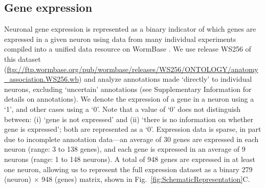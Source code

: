 \documentclass[10pt,letterpaper]{article}
\begin{document}
\subsection*{Gene expression}
Neuronal gene expression is represented as a binary indicator of which genes are expressed in a given neuron using data from many individual experiments compiled into a unified data resource on WormBase \cite{Harris:2009kd}.
We use release WS256 of this dataset (\url{ftp://ftp.wormbase.org/pub/wormbase/releases/WS256/ONTOLOGY/anatomy_association.WS256.wb}) and analyze annotations made `directly' to individual neurons, excluding `uncertain' annotations (see Supplementary Information for details on annotations).
We denote the expression of a gene in a neuron using a `1', and other cases using a `0'.
Note that a value of `0' does not distinguish between:
(i) `gene is not expressed' and
(ii) `there is no information on whether gene is expressed'; both are represented as a `0'.
Expression data is sparse, in part due to incomplete annotation data---an average of 30 genes are expressed in each neuron (range: 3 to 138 genes), and each gene is expressed in an average of 9 neurons (range: 1 to 148 neurons).
A total of 948 genes are expressed in at least one neuron, allowing us to represent the full expression dataset as a binary 279 (neuron) $\times$ 948 (genes) matrix, shown in Fig.~\ref{fig:SchematicRepresentation}C.
\end{document}
